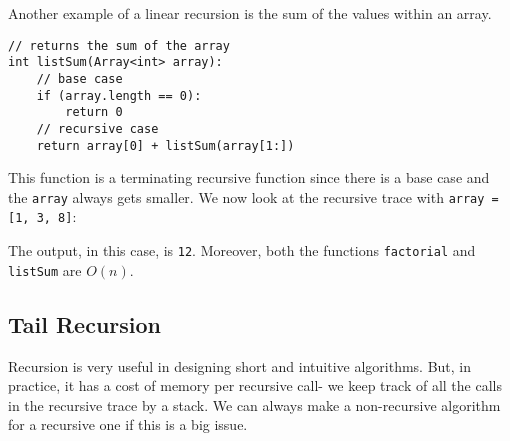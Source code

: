 \documentclass[a4paper, openany]{memoir}
\begin{document}
\noindent Another example of a linear recursion is the sum of the values within an array.
\begin{lstlisting}[language=pseudocode]
// returns the sum of the array
int listSum(Array<int> array):
    // base case
    if (array.length == 0):
        return 0
    // recursive case
    return array[0] + listSum(array[1:])
\end{lstlisting}
This function is a terminating recursive function since there is a base case and the \texttt{array} always gets smaller. We now look at the recursive trace with \texttt{array = [1, 3, 8]}:
\begin{center}
\end{center}
The output, in this case, is \texttt{12}. Moreover, both the functions \texttt{factorial} and \texttt{listSum} are $O(n)$.

\subsection{Tail Recursion}
Recursion is very useful in designing short and intuitive algorithms. But, in practice, it has a cost of memory per recursive call- we keep track of all the calls in the recursive trace by a stack. We can always make a non-recursive algorithm for a recursive one if this is a big issue. 
\end{document}
